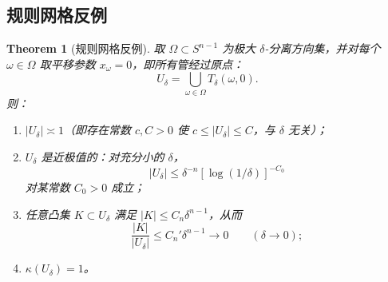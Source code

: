 \documentclass[11pt,a4paper]{article}
\newtheorem{theorem}{Theorem}[section]
\theoremstyle{remark}
\begin{document}
		\subsection{规则网格反例}
		\begin{theorem}[规则网格反例]
		取 $\Omega\subset S^{n-1}$ 为极大 $\delta$-分离方向集，并对每个 $\omega\in\Omega$ 取平移参数 $x_\omega=0$，即所有管经过原点：
		\[U_\delta=\bigcup_{\omega\in\Omega}T_\delta(\omega,0).\]
		则：
		\begin{enumerate}
			\item[(i)] $|U_\delta|\asymp1$（即存在常数 $c,C>0$ 使 $c\le|U_\delta|\le C$，与 $\delta$ 无关）；
			\item[(ii)] $U_\delta$ 是近极值的：对充分小的 $\delta$，
			\[|U_\delta|\le\delta^{-n}[\log(1/\delta)]^{-C_0}\]
			对某常数 $C_0>0$ 成立；
			\item[(iii)] 任意凸集 $K\subset U_\delta$ 满足 $|K|\le C_n\delta^{n-1}$，从而
			\[\frac{|K|}{|U_\delta|}\le C_n'\delta^{n-1}\to0\qquad(\delta\to0);\]
			\item[(iv)] $\kappa(U_\delta)=1$。
		\end{enumerate}
		\end{theorem}
		
\end{document}
